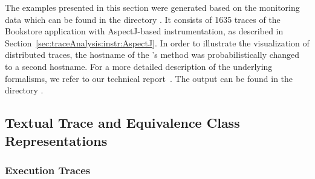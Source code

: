 \newcommand{\OPT}[1]{\texttt{#1}}
\newcommand{\OPTprintValidExecutionTraces}{-\,-print-Execution-Traces}
\newcommand{\OPTprintInvalidExecutionTraces}{-\,-print-invalid-Execution-Traces}
\newcommand{\OPTprintMessageTraces}{-\,-print-Message-Traces}
\newcommand{\OPTprintDeploymentEquivalenceClasses}{-\,-print-Deployment-Equivalence-Classes}
\newcommand{\OPTprintAssemblyEquivalenceClasses}{-\,-print-Assembly-Equivalence-Classes}
\newcommand{\OPTplotDeploymentSequenceDiagrams}{-\,-plot-Deployment-Sequence-Diagrams}
\newcommand{\OPTplotAssemblySequenceDiagrams}{-\,-plot-Assembly-Sequence-Diagrams}
\newcommand{\OPTplotCallTrees}{-\,-plot-Call-Trees}
\newcommand{\OPTplotAggregatedDeploymentCallTree}{-\,-plot-Aggregated-Deployment-Call-Tree}
\newcommand{\OPTplotAggregatedAssemblyCallTree}{-\,-plot-Aggregated-Assembly-Call-Tree}

\newcommand{\OPTplotContainerDependencyGraph}{-\,-plot-Container-Dependency-Graph}
\newcommand{\OPTplotDeploymentComponentDependencyGraph}{-\,-plot-Deployment-Component-Dependency-Graph}
\newcommand{\OPTplotAssemblyComponentDependencyGraph}{-\,-plot-Assembly-Component-Dependency-Graph}
\newcommand{\OPTplotDeploymentOperationDependencyGraph}{-\,-plot-Deployment-Operation-Dependency-Graph}
\newcommand{\OPTplotAssemblyOperationDependencyGraph}{-\,-plot-Assembly-Operation-Dependency-Graph}

The examples presented in this section were generated based on the %
monitoring data which can be found in the directory %
\dir{\distributedTestdataDirDistro/}. It consists of 1635 traces %
of the Bookstore application with AspectJ-based instrumentation, %
as described in Section~\ref{sec:traceAnalysis:instr:AspectJ}. %
In order to illustrate the visualization of distributed traces, %
the hostname of the 's method  was %
probabilistically changed to a second hostname. %
For a more detailed description of the underlying formalisms, %
we refer to our technical report~\cite{vanHoornRohrHasselbringWallerEhlersFreyKieselhorst2009TRContinuousMonitoringOfSoftwareServicesDesignAndApplicationOfTheKiekerFramework}. %
The output can be found in the directory %
.

\subsection{Textual Trace and Equivalence Class Representations}

\subsubsection{Execution Traces}\label{sec:example:executionTraces}%

